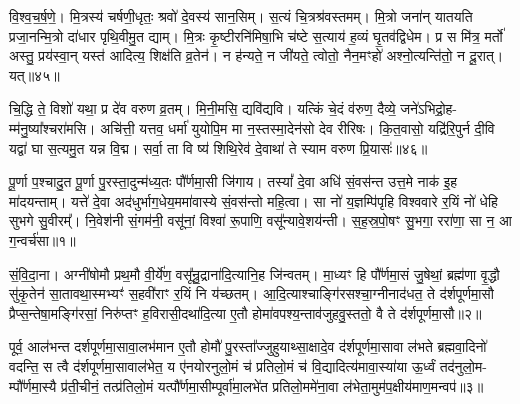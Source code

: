 वि॒श्व॒च॒र्\mbox{}ष॒णे॒। मि॒त्रस्य॑ चर्\mbox{}षणी॒धृतः॒ श्रवो॑ दे॒वस्य॑ सान॒सिम्। स॒त्यं चि॒त्रश्र॑वस्तमम्। मि॒त्रो जना॑न् यातयति प्रजा॒नन्मि॒त्रो दा॑धार पृथि॒वीमु॒त द्याम्। मि॒त्रः कृ॒ष्टीरनि॑मिषा॒भि च॑ष्टे स॒त्याय॑ ह॒व्यं घृ॒तव॑द्विधेम। प्र स मि॑त्र॒ मर्तो॑ अस्तु॒ प्रय॑स्वा॒न् यस्त॑ आदित्य॒ शिक्ष॑ति व्र॒तेन॑। न ह॑न्यते॒ न जी॑यते॒ त्वोतो॒ नैन॒मꣳहो॑ अश्नो॒त्यन्ति॑तो॒ न दू॒रात्। यत्॥४५॥

चि॒द्धि ते॒ विशो॑ यथा॒ प्र दे॑व वरुण व्र॒तम्। मि॒नी॒मसि॒ द्यवि॑द्यवि। यत्किं चे॒दं व॑रुण॒ दैव्ये॒ जने॑\-ऽभिद्रो॒ह- म्म॑नु॒ष्या᳚श्चरा॑मसि। अचि॑त्ती॒ यत्तव॒ धर्मा॑ युयोपि॒म मा न॒स्तस्मा॒देन॑सो देव रीरिषः। कि॒त॒वासो॒ यद्रि॑रि॒पुर्न दी॒वि यद्वा॑ घा स॒त्यमु॒त यन्न वि॒द्म। सर्वा॒ ता वि ष्य॑ शिथि॒रेव॑ दे॒वाथा॑ ते स्याम वरुण प्रि॒यासः॑॥४६॥

{\anuvakamend[{सोमो॒ गोषु॒ मा र॒यिं मन्त्रो॒ यच्छि॑थि॒रा स॒प्त च॑॥11॥}]}


{}

\setcounter{anuvakam}{0}
पू॒र्णा प॒श्चादु॒त पू॒र्णा पु॒रस्ता॒दुन्म॑ध्य॒तः पौ᳚र्णमा॒सी जि॑गाय। तस्यां᳚ दे॒वा अधि॑ सं॒वस॑न्त उत्त॒मे नाक॑ इ॒ह मा॑दयन्ताम्। यत्ते॑ दे॒वा अद॑धुर्भाग॒धेय॒ममा॑वास्ये सं॒वस॑न्तो महि॒त्वा। सा नो॑ य॒ज्ञम्पि॑पृहि विश्ववारे र॒यिं नो॑ धेहि सुभगे सु॒वीरम्᳚। नि॒वेश॑नी सं॒गम॑नी॒ वसू॑नां॒ विश्वा॑ रू॒पाणि॒ वसू᳚न्यावे॒शय॑न्ती। स॒ह॒स्र॒पो॒षꣳ सु॒भगा॒ ररा॑णा॒ सा न॒ आ ग॒न्वर्च॑सा॥१॥

सं॒वि॒दा॒ना। अग्नी॑षोमौ प्रथ॒मौ वी॒र्ये॑ण॒ वसू᳚न्रु॒द्राना॑दि॒त्यानि॒ह जि॑न्वतम्। मा॒ध्यꣳ हि पौ᳚र्णमा॒सं जु॒षेथां॒ ब्रह्म॑णा वृ॒द्धौ सु॑कृ॒तेन॑ सा॒तावथा॒स्मभ्यꣳ॑ स॒हवी॑राꣳ र॒यिं नि य॑च्छतम्। आ॒दि॒त्याश्चाङ्गि॑रसश्चा॒ग्नीनाद॑धत॒ ते द॑र्\mbox{}शपूर्णमा॒सौ प्रैप्स॒न्तेषा॒मङ्गि॑रसां॒ निरु॑प्तꣳ ह॒विरासी॒दथा॑दि॒त्या ए॒तौ होमा॑वपश्य॒न्ताव॑जुहवु॒स्ततो॒ वै ते द॑र्\mbox{}शपूर्णमा॒सौ॥२॥

पूर्व॒ आल॑भन्त दर्\mbox{}शपूर्णमा॒सावा॒लभ॑मान ए॒तौ होमौ॑ पु॒रस्ता᳚ज्जुहुयाथ्सा॒क्षादे॒व द॑र्\mbox{}शपूर्णमा॒सावा ल॑भते ब्रह्मवा॒दिनो॑ वदन्ति॒ स त्वै द॑र्\mbox{}शपूर्णमा॒सावाल॑भेत॒ य ए॑नयोरनुलो॒मं च॑ प्रतिलो॒मं च॑ वि॒द्यादित्य॑मावा॒स्या॑या ऊ॒र्ध्वं तद॑नुलो॒म- म्पौ᳚र्णमा॒स्यै प्र॑ती॒चीनं॒ तत्प्र॑तिलो॒मं यत्पौ᳚र्णमा॒सीम्पूर्वा॑मा॒लभे॑त प्रतिलो॒ममे॑ना॒वा ल॑भेता॒मुम॑प॒क्षीय॑माण॒मन्वप॑॥३॥

